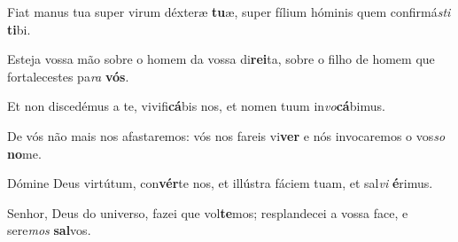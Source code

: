 \begin{greenumerate}

  \item Fiat manus tua super virum déxteræ \textbf{tu}æ, {\GreStar} super fílium hóminis quem confirmá\textit{sti} \textbf{ti}bi. 

  \switchcolumn%

  \item Esteja vossa mão sobre o homem da vossa di\textbf{rei}ta, {\GreStar} sobre o filho de homem que fortalecestes pa\textit{ra} \textbf{vós}. 

  \switchcolumn*


  \item Et non discedémus a te, vivifi\textbf{cá}bis nos, {\GreStar} et nomen tuum in\textit{vo}\textbf{cá}bimus. 

  \switchcolumn%

  \item De vós não mais nos afastaremos: vós nos fareis vi\textbf{ver} {\GreStar} e nós invocaremos o vos\textit{so} \textbf{no}me. 

  \switchcolumn*


  \item Dómine Deus virtútum, con\textbf{vér}te nos, {\GreStar} et illústra fáciem tuam, et sal\textit{vi} \textbf{é}rimus. 

  \switchcolumn%

  \item Senhor, Deus do universo, fazei que vol\textbf{te}mos; {\GreStar} resplandecei a vossa face, e sere\textit{mos} \textbf{sal}vos. 
\end{greenumerate}
